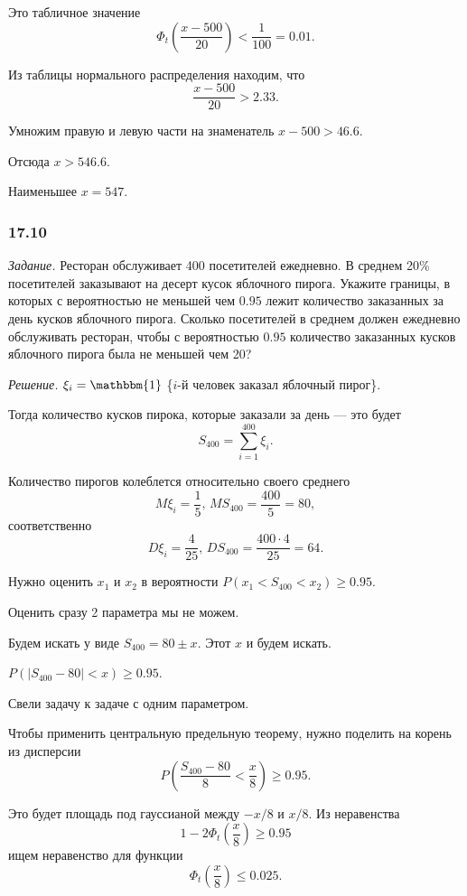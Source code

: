 Это табличное значение
$$ \Phi_t \left( \frac{x - 500}{20} \right) <
  \frac{1}{100} =
  0.01.$$

Из таблицы нормального распределения находим, что
$$ \frac{x - 500}{20} >
  2.33.$$

Умножим правую и левую части на знаменатель $x - 500 > 46.6$.

Отсюда $x > 546.6.$

Наименьшее $x = 547$.

\subsubsection{17.10}

\textit{Задание.} Ресторан обслуживает 400 посетителей ежедневно.
В среднем 20\% посетителей заказывают на десерт кусок яблочного пирога.
Укажите границы,
в которых с вероятностью не меньшей чем $0.95$
лежит количество заказанных за день кусков яблочного пирога.
Сколько посетителей в среднем должен ежедневно обслуживать ресторан,
чтобы с вероятностью $0.95$ количество заказанных кусков яблочного пирога была не меньшей чем 20?

\textit{Решение.} $ \xi_i = \mathbbm{1}$ \{$i$-й человек заказал яблочный пирог\}.

Тогда количество кусков пирока, которые заказали за день --- это будет
$$S_{400} =
  \sum \limits_{i = 1}^{400} \xi_i.$$

Количество пирогов колеблется относительно своего среднего
$$M \xi_i = \frac{1}{5}, \,
  MS_{400} = \frac{400}{5} = 80,$$
соответственно
$$D \xi_i = \frac{4}{25}, \,
DS_{400} = \frac{400 \cdot 4}{25} = 64.$$

Нужно оценить $x_1$ и $x_2$ в вероятности $P \left( x_1 < S_{400} < x_2 \right) \geq 0.95$.

Оценить сразу 2 параметра мы не можем.

Будем искать у виде $S_{400} = 80 \pm x$.
Этот $x$ и будем искать.


$P \left( \left| S_{400} - 80 \right| < x \right) \geq 0.95$.

Свели задачу к задаче с одним параметром.

Чтобы применить центральную предельную теорему, нужно поделить на корень из дисперсии
$$P \left( \frac{S_{400} - 80}{8} < \frac{x}{8} \right) \geq
  0.95.$$

Это будет площадь под гауссианой между $- x / 8$ и $x / 8$.
Из неравенства
$$1 - 2 \Phi_t \left( \frac{x}{8} \right) \geq
  0.95$$
ищем неравенство для функции
$$ \Phi_t \left( \frac{x}{8} \right) \leq
  0.025.$$

